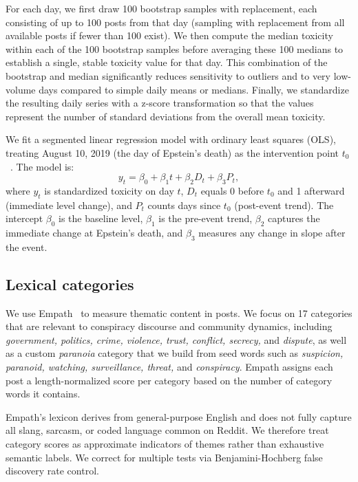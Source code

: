 \documentclass[letterpaper]{article} %
\begin{document}
For each day, we first draw 100 bootstrap samples with replacement, each consisting of up to 100 posts from that day (sampling with replacement from all available posts if fewer than 100 exist).
We then compute the median toxicity within each of the 100 bootstrap samples before averaging these 100 medians to establish a single, stable toxicity value for that day.
This combination of the bootstrap and median significantly reduces sensitivity to outliers and to very low-volume days compared to simple daily means or medians.
Finally, we standardize the resulting daily series with a z-score transformation so that the values represent the number of standard deviations from the overall mean toxicity.

We fit a segmented linear regression model with ordinary least squares (OLS), treating August 10, 2019 (the day of Epstein's death) as the intervention point $t_0$~\citep{trujillo_make_2022}.
The model is:
\begin{equation}
    y_t = \beta_0 + \beta_1 t + \beta_2 D_t + \beta_3 P_t,
\end{equation}
where $y_t$ is standardized toxicity on day $t$, $D_t$ equals 0 before $t_0$ and 1 afterward (immediate level change), and $P_t$ counts days since $t_0$ (post-event trend). 
The intercept $\beta_0$ is the baseline level, $\beta_1$ is the pre-event trend, $\beta_2$ captures the immediate change at Epstein's death, and $\beta_3$ measures any change in slope after the event.

\subsection{Lexical categories}

We use Empath~\citep{fast_ejhfastempath-client_2025} to measure thematic content in posts. 
We focus on 17 categories that are relevant to conspiracy discourse and community dynamics, including \textit{government, politics, crime, violence, trust, conflict, secrecy,} and \textit{dispute}, as well as a custom \textit{paranoia} category that we build from seed words such as \textit{suspicion, paranoid, watching, surveillance, threat,} and \textit{conspiracy}. 
Empath assigns each post a length-normalized score per category based on the number of category words it contains.

Empath's lexicon derives from general-purpose English and does not fully capture all slang, sarcasm, or coded language common on Reddit.
We therefore treat category scores as approximate indicators of themes rather than exhaustive semantic labels.
We correct for multiple tests via Benjamini-Hochberg false discovery rate control.
\end{document}
